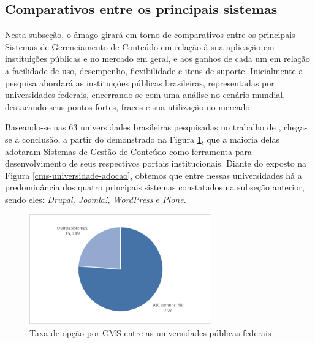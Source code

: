 \hspace{2.5cm}

\subsection{Comparativos entre os principais sistemas}
\label{subsec:comparacao}

\hspace{2.5cm}


Nesta subseção, o âmago girará em torno de comparativos entre os principais Sistemas de Gerenciamento de Conteúdo em relação à sua aplicação em instituições públicas e no mercado em geral, e aos ganhos de cada um em relação a facilidade de uso, desempenho, flexibilidade e itens de suporte. Inicialmente a pesquisa abordará as instituições públicas brasileiras, representadas por universidades federais, encerrando-se com uma análise no cenário mundial, destacando seus pontos fortes, fracos e sua utilização no mercado. 

Baseando-se nas 63 universidades brasileiras pesquisadas no trabalho de , chega-se à conclusão, a partir do demonstrado na Figura \ref{cms-universidade-opcao}, que a maioria delas adotaram Sistemas de Gestão de Conteúdo como ferramenta para desenvolvimento de seus respectivos portais institucionais. Diante do exposto na Figura \ref{cms-universidade-adocao}, obtemos que entre nessas universidades há a predominância dos quatro principais sistemas constatados na subseção anterior, sendo eles: \textit{Drupal, Joomla!, WordPress} e \textit{Plone}.

\begin{figure}[htb]
 \centering
 \caption{Taxa de opção por CMS entre as universidades públicas federais}
 \includegraphics[width=0.7\textwidth]{figuras/adocao-de-cms}
 
 \label{cms-universidade-opcao}
\end{figure}

